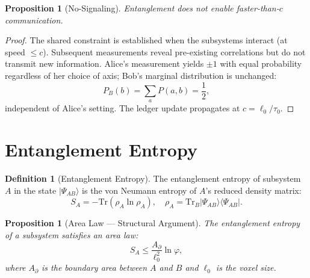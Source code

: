 \documentclass[12pt,a4paper]{article}
\newtheorem{proposition}[theorem]{Proposition}
\theoremstyle{definition}
\newtheorem{definition}[theorem]{Definition}
\theoremstyle{remark}
\begin{document}
\begin{proposition}[No-Signaling]
\label{thm:no-signal}
Entanglement does not enable faster-than-$c$ communication.
\end{proposition}

\begin{proof}
The shared constraint is established when the subsystems interact
(at speed $\leq c$).  Subsequent measurements reveal pre-existing
correlations but do not transmit new information.  Alice's
measurement yields $\pm 1$ with equal probability regardless of her
choice of axis; Bob's marginal distribution is unchanged:
\begin{equation}
  P_B(b) = \sum_a P(a, b) = \frac{1}{2},
\end{equation}
independent of Alice's setting.  The ledger update propagates at
$c = \ell_0/\tau_0$.
\end{proof}

\section{Entanglement Entropy}
\label{sec:entropy}

\begin{definition}[Entanglement Entropy]
The entanglement entropy of subsystem $A$ in the state
$|\Psi_{AB}\rangle$ is the von Neumann entropy of $A$'s reduced
density matrix:
\begin{equation}
  S_A = -\mathrm{Tr}(\rho_A \ln \rho_A),
  \quad \rho_A = \mathrm{Tr}_B |\Psi_{AB}\rangle
  \langle\Psi_{AB}|.
\end{equation}
\end{definition}

\begin{proposition}[Area Law --- Structural Argument]
\label{thm:area}
The entanglement entropy of a subsystem satisfies an area law:
\begin{equation}
  \boxed{S_A \leq \frac{A_{\partial}}{\ell_0^2}\ln\varphi,}
\end{equation}
where $A_{\partial}$ is the boundary area between $A$ and $B$
and $\ell_0$ is the voxel size.
\end{proposition}
\end{document}
